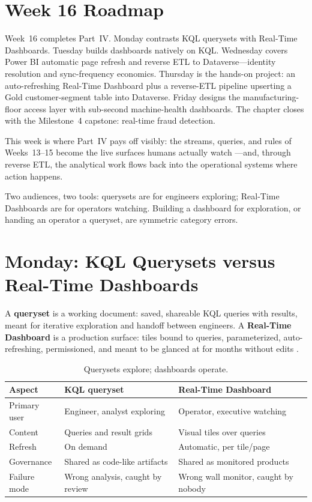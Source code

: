 \section{Week 16 Roadmap}
Week~16 completes Part~IV. Monday contrasts KQL querysets with Real-Time Dashboards. Tuesday builds dashboards natively on KQL. Wednesday covers Power BI automatic page refresh and reverse ETL to Dataverse---identity resolution and sync-frequency economics. Thursday is the hands-on project: an auto-refreshing Real-Time Dashboard plus a reverse-ETL pipeline upserting a Gold customer-segment table into Dataverse. Friday designs the manufacturing-floor access layer with sub-second machine-health dashboards. The chapter closes with the Milestone~4 capstone: real-time fraud detection.

This week is where Part~IV pays off visibly: the streams, queries, and rules of Weeks~13--15 become the live surfaces humans actually watch \cite{microsoftRealTimeDashboards}---and, through reverse ETL, the analytical work flows back into the operational systems where action happens.

\begin{notebox}
Two audiences, two tools: querysets are for engineers exploring; Real-Time Dashboards are for operators watching. Building a dashboard for exploration, or handing an operator a queryset, are symmetric category errors.
\end{notebox}

\section{Monday: KQL Querysets versus Real-Time Dashboards}
A \textbf{queryset} is a working document: saved, shareable KQL queries with results, meant for iterative exploration and handoff between engineers. A \textbf{Real-Time Dashboard} is a production surface: tiles bound to queries, parameterized, auto-refreshing, permissioned, and meant to be glanced at for months without edits \cite{microsoftRealTimeDashboards,microsoftKQL}.

\begin{table}[H]
\centering
\small
\begin{tabular}{@{}p{3.8cm}p{5.0cm}p{5.0cm}@{}}
\toprule
\textbf{Aspect} & \textbf{KQL queryset} & \textbf{Real-Time Dashboard} \\
\midrule
Primary user & Engineer, analyst exploring & Operator, executive watching \\
Content & Queries and result grids & Visual tiles over queries \\
Refresh & On demand & Automatic, per tile/page \\
Governance & Shared as code-like artifacts & Shared as monitored products \\
Failure mode & Wrong analysis, caught by review & Wrong wall monitor, caught by nobody \\
\bottomrule
\end{tabular}
\caption{Querysets explore; dashboards operate.}
\label{tab:chapter16-queryset-vs-dashboard}
\end{table}

